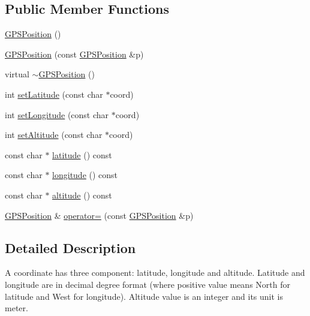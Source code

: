 \subsection*{Public Member Functions}
\begin{DoxyCompactItemize}
\item 
\hyperlink{classsmrtobj_1_1data_1_1_g_p_s_position_a889299fa5dfebdaab1f9b4bf8e01c309}{G\+P\+S\+Position} ()
\item 
\hyperlink{classsmrtobj_1_1data_1_1_g_p_s_position_a74273f6305b3256cb893eb383f789cad}{G\+P\+S\+Position} (const \hyperlink{classsmrtobj_1_1data_1_1_g_p_s_position}{G\+P\+S\+Position} \&p)
\item 
virtual \hyperlink{classsmrtobj_1_1data_1_1_g_p_s_position_a0a4662869b19a1a34205de7617522672}{$\sim$\+G\+P\+S\+Position} ()
\item 
int \hyperlink{classsmrtobj_1_1data_1_1_g_p_s_position_af879e729f645baa2c7e14cc97ebc9d06}{set\+Latitude} (const char $\ast$coord)
\item 
int \hyperlink{classsmrtobj_1_1data_1_1_g_p_s_position_a8a8cd527c4f269bc79311a1ab598bad7}{set\+Longitude} (const char $\ast$coord)
\item 
int \hyperlink{classsmrtobj_1_1data_1_1_g_p_s_position_a8fba1b842baf00689583e243e0bce528}{set\+Altitude} (const char $\ast$coord)
\item 
const char $\ast$ \hyperlink{classsmrtobj_1_1data_1_1_g_p_s_position_a12f3c560ed01dd84fe20ea12eaa168fc}{latitude} () const 
\item 
const char $\ast$ \hyperlink{classsmrtobj_1_1data_1_1_g_p_s_position_a11b170f612c159bc631e70d4d9871fdc}{longitude} () const 
\item 
const char $\ast$ \hyperlink{classsmrtobj_1_1data_1_1_g_p_s_position_a8d7af005bc7e4dd394ccc329a0c02fb7}{altitude} () const 
\item 
\hyperlink{classsmrtobj_1_1data_1_1_g_p_s_position}{G\+P\+S\+Position} \& \hyperlink{classsmrtobj_1_1data_1_1_g_p_s_position_a28d6a1ae71334c76777921032a0afcfd}{operator=} (const \hyperlink{classsmrtobj_1_1data_1_1_g_p_s_position}{G\+P\+S\+Position} \&p)
\end{DoxyCompactItemize}


\subsection{Detailed Description}
A coordinate has three component\+: latitude, longitude and altitude. Latitude and longitude are in decimal degree format (where positive value means North for latitude and West for longitude). Altitude value is an integer and its unit is meter. 

